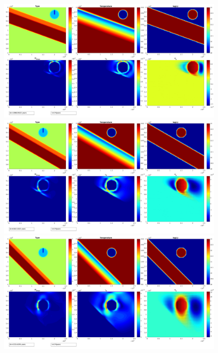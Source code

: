 \documentclass[12pt]{scrreprt}
\begin{document}
\begin{figure}[!ht]
	\begin{minipage}[t]{1.0\textwidth}
		\begin{minipage}[t]{0.5\textwidth}
			\includegraphics[width=1.0\textwidth]{./Snapshots/ref/Subductionzonewithblob1posrefslab20s2e7s2e7r20.jpg}
		\end{minipage}
		\begin{minipage}[t]{0.5\textwidth}
			\includegraphics[width=1.0\textwidth]{./Snapshots/ref/Subductionzonewithblob1posrefslab30s2e7s2e7r20.jpg}
		\end{minipage}
	\end{minipage}
	\begin{minipage}[c]{1.0\textwidth}
		\begin{minipage}[t]{0.5\textwidth}
			\includegraphics[width=1.0\textwidth]{./Snapshots/ref/Subductionzonewithblob1posrefslab45s2e7s2e7r20.jpg}

\end{minipage}
\end{minipage}
\end{figure}
\end{document}
